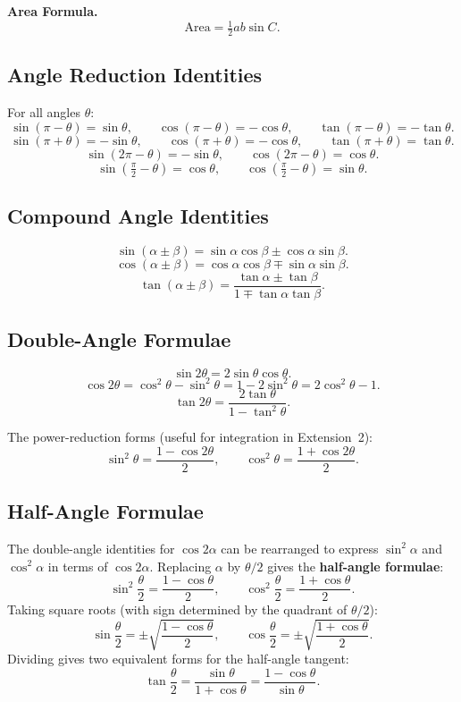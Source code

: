 \documentclass[12pt]{article}
\begin{document}
\textbf{Area Formula.}
\[
\text{Area} = \tfrac{1}{2}ab\sin C.
\]

\subsection{Angle Reduction Identities}

For all angles $\theta$:
\[
\sin(\pi - \theta) = \sin\theta, \qquad \cos(\pi-\theta) = -\cos\theta, \qquad \tan(\pi-\theta) = -\tan\theta.
\]
\[
\sin(\pi + \theta) = -\sin\theta, \qquad \cos(\pi+\theta) = -\cos\theta, \qquad \tan(\pi+\theta) = \tan\theta.
\]
\[
\sin(2\pi - \theta) = -\sin\theta, \qquad \cos(2\pi - \theta) = \cos\theta.
\]
\[
\sin\!\left(\tfrac{\pi}{2}-\theta\right) = \cos\theta, \qquad \cos\!\left(\tfrac{\pi}{2}-\theta\right) = \sin\theta.
\]

\subsection{Compound Angle Identities}
\[
\sin(\alpha \pm \beta) = \sin\alpha\cos\beta \pm \cos\alpha\sin\beta.
\]
\[
\cos(\alpha \pm \beta) = \cos\alpha\cos\beta \mp \sin\alpha\sin\beta.
\]
\[
\tan(\alpha \pm \beta) = \frac{\tan\alpha \pm \tan\beta}{1 \mp \tan\alpha\tan\beta}.
\]

\subsection{Double-Angle Formulae}
\[
\sin 2\theta = 2\sin\theta\cos\theta.
\]
\[
\cos 2\theta = \cos^2\theta - \sin^2\theta = 1 - 2\sin^2\theta = 2\cos^2\theta - 1.
\]
\[
\tan 2\theta = \frac{2\tan\theta}{1 - \tan^2\theta}.
\]

The power-reduction forms (useful for integration in Extension~2):
\[
\sin^2\theta = \frac{1-\cos 2\theta}{2}, \qquad \cos^2\theta = \frac{1+\cos 2\theta}{2}.
\]

\subsection{Half-Angle Formulae}

The double-angle identities for $\cos 2\alpha$ can be rearranged to express
$\sin^2\!\alpha$ and $\cos^2\!\alpha$ in terms of $\cos 2\alpha$.
Replacing $\alpha$ by $\theta/2$ gives the \textbf{half-angle formulae}:
\[
\sin^2\!\frac{\theta}{2} = \frac{1-\cos\theta}{2}, \qquad
\cos^2\!\frac{\theta}{2} = \frac{1+\cos\theta}{2}.
\]
Taking square roots (with sign determined by the quadrant of $\theta/2$):
\[
\sin\frac{\theta}{2} = \pm\sqrt{\frac{1-\cos\theta}{2}}, \qquad
\cos\frac{\theta}{2} = \pm\sqrt{\frac{1+\cos\theta}{2}}.
\]
Dividing gives two equivalent forms for the half-angle tangent:
\[
\tan\frac{\theta}{2} = \frac{\sin\theta}{1+\cos\theta} = \frac{1-\cos\theta}{\sin\theta}.
\]
\end{document}
